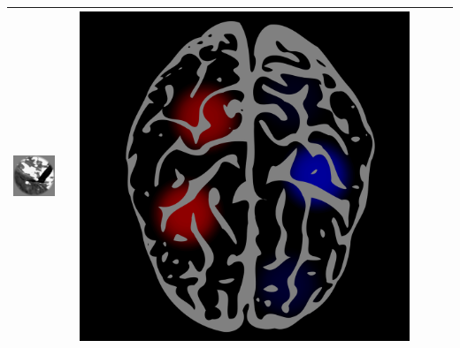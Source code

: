 \documentclass{beamer}
\begin{document}
\begin{frame}
\begin{center}
\begin{tabular}{ccc||ccc}
\includegraphics[scale = .26]{img3.png} & \hspace{0.2in} & \includegraphics[scale = 0.035]{brain3.png} \\ \hline

\end{tabular}
\end{center}
\end{frame}
\end{document}
